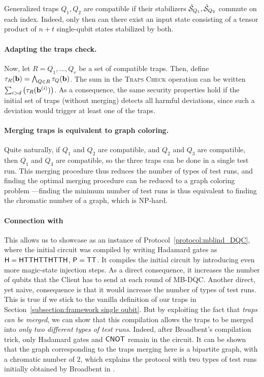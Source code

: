 \begin{definition}
    Generalized traps $Q_1, Q_2$ are compatible if their stabilizers $\hat{\mathcal{S}}_{Q_1}, \hat{\mathcal{S}}_{Q_2}$ commute on each index. Indeed, only then can there exist an input state consisting of a tensor product of $n+t$ single-qubit states stabilized by both.
\end{definition}
\paragraph{Adapting the traps check.}
Now, let $R=Q_1, ..., Q_r$ be a set of compatible traps. Then, define $\tau_R(\mathbf b)= \bigwedge_{Q\in R} \tau_Q(\mathbf b)$. The sum in the \textsc{Traps Check} operation can be written
$\sum_{i>d}
\left(
    \tau_R(\mathbf b^{(i)})
\right)
$. As a consequence, the same security properties hold if the initial set of traps (without merging) detects all harmful deviations, since such a deviation would trigger at least one of the traps.

\paragraph{Merging traps is equivalent to graph coloring.}
Quite naturally, if $Q_1$ and $Q_2$ are compatible, and $Q_2$ and $Q_3$ are compatible, then $Q_1$ and $Q_3$ are compatible, so the three traps can be done in a single test run. This merging procedure thus reduces the number of types of test runs, and finding the optimal merging procedure can be reduced to a graph coloring problem \cite{BNZ25sampling,VYI19measurement}—finding the minimum number of test runs is thus equivalent to finding the chromatic number of a graph, which is NP-hard.

\paragraph{Connection with \cite{B18how}}
This allows us to showcase \cite{B18how} as an instance of Protocol~\ref{protocol:mblind_DQC}, where the initial circuit was compiled by writing Hadamard gates as $\mathsf{H}=\mathsf{H}\mathsf{T}\mathsf{T}\mathsf{H}\mathsf{T}\mathsf{T}\mathsf{H}\mathsf{T}\mathsf{T}\mathsf{H}$, $\mathsf{P}=\mathsf{T}\mathsf{T}$. It compiles the initial circuit by introducing even more magic-state injection steps. As a direct consequence, it increases the number of qubits that the Client has to send at each round of MB-DQC. Another direct, yet naive, consequence is that it would increase the number of types of test runs. This is true if we stick to the vanilla definition of our traps in Section~\ref{subsection:framework single qubit}. But by exploiting the fact that \emph{traps can be merged}, we can show that this compilation allows the traps to be merged into \emph{only two different types of test runs}. Indeed, after Broadbent's compilation trick, only Hadamard gates and $\mathsf{CNOT}$ remain in the circuit.
It can be shown that the graph corresponding to the traps merging here is a bipartite graph, with a chromatic number of $2$, which explains the protocol with two types of test runs initially obtained by Broadbent in \cite{B18how}.

